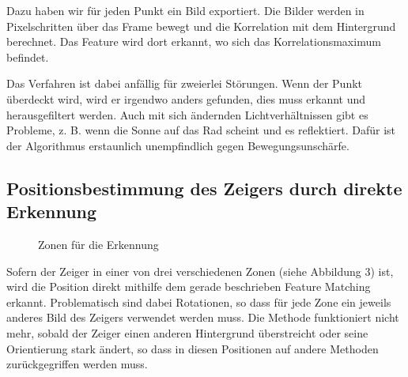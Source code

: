 \documentclass[a4paper,german,12pt,smallheadings]{scrartcl}
\begin{document}
Dazu haben wir für jeden Punkt ein Bild exportiert. Die Bilder werden in
Pixelschritten über das Frame bewegt und die Korrelation mit dem Hintergrund
berechnet. Das Feature wird dort erkannt, wo sich das Korrelationsmaximum
befindet.

Das Verfahren ist dabei anfällig für zweierlei Störungen. Wenn der Punkt
überdeckt wird, wird er irgendwo anders gefunden, dies muss erkannt und
herausgefiltert werden. Auch mit sich ändernden Lichtverhältnissen gibt es
Probleme, z. B. wenn die Sonne auf das Rad scheint und es reflektiert. Dafür
ist der Algorithmus erstaunlich unempfindlich gegen Bewegungsunschärfe.

\subsection{Positionsbestimmung des Zeigers durch direkte Erkennung}
\begin{figure}
  \label{zones}
  \caption{Zonen für die Erkennung}
\end{figure}
Sofern der Zeiger in einer von drei verschiedenen Zonen (siehe Abbildung 3)
ist, wird die Position direkt mithilfe dem gerade beschrieben Feature Matching
erkannt. Problematisch sind dabei Rotationen, so dass für jede Zone ein jeweils
anderes Bild des Zeigers verwendet werden muss. Die Methode funktioniert nicht
mehr, sobald der Zeiger einen anderen Hintergrund überstreicht oder seine
Orientierung stark ändert, so dass in diesen Positionen auf andere Methoden
zurückgegriffen werden muss.
\end{document}
